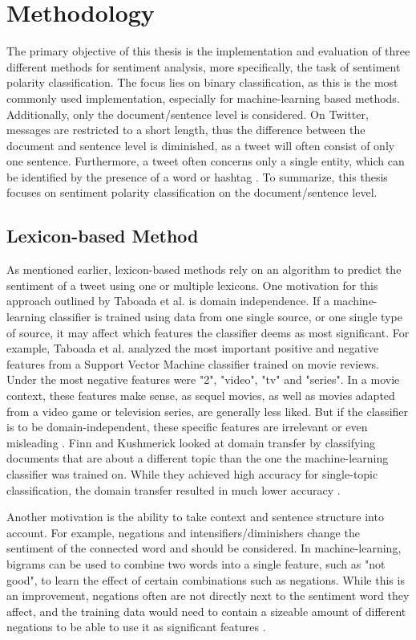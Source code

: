 \chapter{Methodology}
\label{cha:Chapter4_Methodology}
The primary objective of this thesis is the implementation and evaluation of three different methods for sentiment analysis, more specifically, the task of sentiment polarity classification. The focus lies on binary classification, as this is the most commonly used implementation, especially for machine-learning based methods. Additionally, only the document/sentence level is considered. On Twitter, messages are restricted to a short length, thus the difference between the document and sentence level is diminished, as a tweet will often consist of only one sentence. Furthermore, a tweet often concerns only a single entity, which can be identified by the presence of a word or hashtag \cite{DBLP:journals/csur/GiachanouC16}. To summarize, this thesis focuses on sentiment polarity classification on the document/sentence level.

\section{Lexicon-based Method}
As mentioned earlier, lexicon-based methods rely on an algorithm to predict the sentiment of a tweet using one or multiple lexicons. One motivation for this approach outlined by Taboada et al. is domain independence. If a machine-learning classifier is trained using data from one single source, or one single type of source, it may affect which features the classifier deems as most significant. For example, Taboada et al. analyzed the most important positive and negative features from a Support Vector Machine classifier trained on movie reviews. Under the most negative features were "2", "video", "tv" and "series". In a movie context, these features make sense, as sequel movies, as well as movies adapted from a video game or television series, are generally less liked. But if the classifier is to be domain-independent, these specific features are irrelevant or even misleading \cite{taboada}. Finn and Kushmerick looked at domain transfer by classifying documents that are about a different topic than the one the machine-learning classifier was trained on. While they achieved high accuracy for single-topic classification, the domain transfer resulted in much lower accuracy \cite{Finn03learningto}.

Another motivation is the ability to take context and sentence structure into account. For example, negations and intensifiers/diminishers change the sentiment of the connected word and should be considered. In machine-learning, bigrams can be used to combine two words into a single feature, such as "not good", to learn the effect of certain combinations such as negations. While this is an improvement, negations often are not directly next to the sentiment word they affect, and the training data would need to contain a sizeable amount of different negations to be able to use it as significant features \cite{taboada}.

